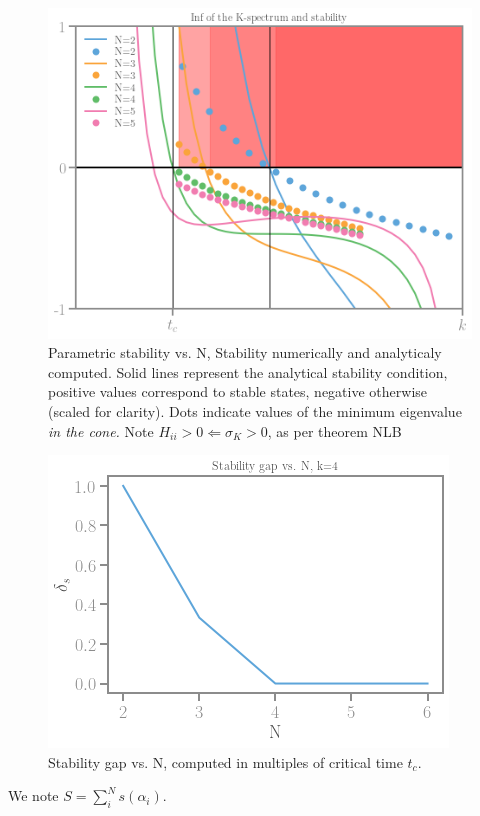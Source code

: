 \documentclass[]{article}
\begin{document}
\begin{figure}[htbp]
    \centering
    \includegraphics[width=.8\textwidth]{stability_param_num_anal.png}
    \caption{Parametric stability vs. N, Stability numerically and analyticaly computed. Solid lines represent the analytical stability condition, positive values correspond to stable states, negative otherwise (scaled for clarity). Dots indicate values of the minimum eigenvalue \emph{in the cone.} Note $H_{ii}>0 \Longleftarrow \sigma_K > 0$, as per theorem NLB}
    \label{<label>}
\end{figure}

\begin{figure}[htbp]
    \centering
    \includegraphics[width=.8\textwidth]{stability_gap.png}
    \caption{Stability gap vs. N, computed in multiples of critical time $t_c$.}
    \label{<label>}
\end{figure}


We note $S=\sum_i^N s(\alpha_i)$.
\end{document}
